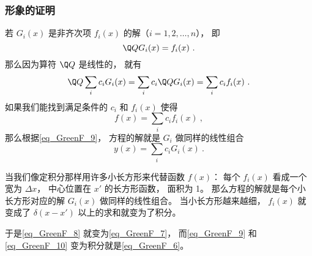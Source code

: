 \subsubsection{形象的证明}
若 $G_i(x)$ 是非齐次项 $f_i(x)$ 的解（$i = 1,2,\dots, n$）， 即
\begin{equation}\label{eq_GreenF_8}
\Q Q G_i(x) = f_i(x)~.
\end{equation}
那么因为算符 $\Q Q$ 是线性的， 就有
\begin{equation}\label{eq_GreenF_9}
\Q Q\sum_i c_i G_i(x) = \sum_i c_i \Q Q G_i(x) = \sum_i c_i f_i(x)~.
\end{equation}
如果我们能找到满足条件的 $c_i$ 和 $f_i(x)$ 使得
\begin{equation}\label{eq_GreenF_10}
f(x) = \sum_i c_i f_i(x)~,
\end{equation}
那么根据\autoref{eq_GreenF_9}， 方程的解就是 $G_i$ 做同样的线性组合
\begin{equation}
y(x) = \sum_i c_i G_i(x)~.
\end{equation}

当我们像定积分那样用许多小长方形来代替函数 $f(x)$： 每个 $f_i(x)$ 看成一个宽为 $\Delta x$， 中心位置在 $x'$ 的长方形函数， 面积为 1。 那么方程的解就是每个小长方形对应的解 $G_i(x)$ 做同样的线性组合。 当小长方形越来越细， $f_i(x)$ 就变成了 $\delta(x - x')$ 以上的求和就变为了积分。

于是\autoref{eq_GreenF_8} 就变为\autoref{eq_GreenF_7}， 而\autoref{eq_GreenF_9} 和\autoref{eq_GreenF_10} 变为积分就是\autoref{eq_GreenF_6}。 
